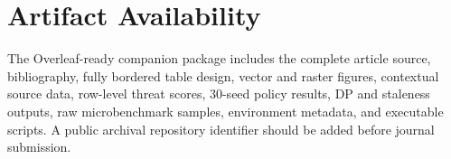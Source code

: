 \documentclass[journal]{IEEEtran}
\begin{document}
\section*{Artifact Availability}
The Overleaf-ready companion package includes the complete article source, bibliography, fully bordered table design, vector and raster figures, contextual source data, row-level threat scores, 30-seed policy results, DP and staleness outputs, raw microbenchmark samples, environment metadata, and executable scripts. A public archival repository identifier should be added before journal submission.

\balance


\end{document}

